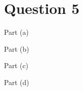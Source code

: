 \section{Question 5}

\begin{frame}[shrink=30]{Part (a)}
    
    
    
\end{frame}

\begin{frame}[shrink=30]{Part (b)}
    
    
    
\end{frame}

\begin{frame}[shrink=30]{Part (c)}
    
    
    
\end{frame}

\begin{frame}[shrink=30]{Part (d)}
    
    
    
\end{frame}
